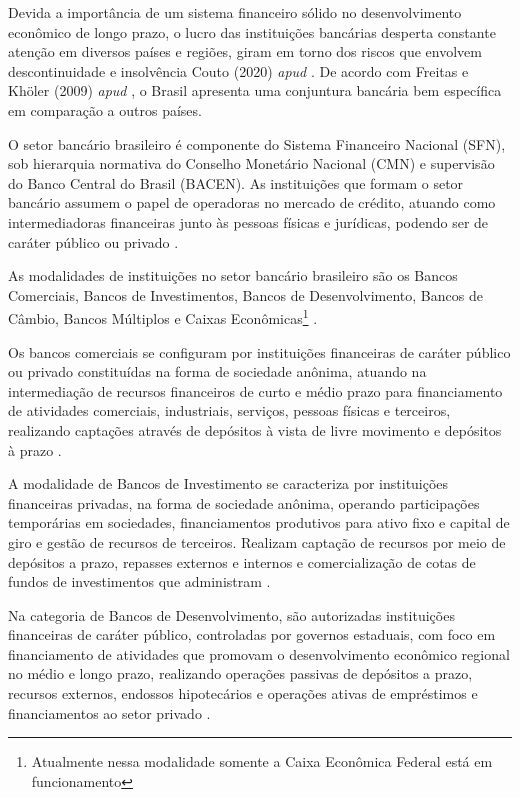 \documentclass[12pt,openright,oneside,a4paper,chapter=TITLE,section=TITLE,subsection=Title,english,french,spanish,portugues,sumario=tradicional]{04-class-files/abntex2}
\begin{document}
Devida a importância de um sistema financeiro sólido no desenvolvimento
econômico de longo prazo, o lucro das instituições bancárias desperta constante
atenção em diversos países e regiões, giram em torno dos riscos que envolvem
descontinuidade e insolvência Couto (2020) \emph{apud} \cite{dantas:2012}. De acordo
com Freitas e Khöler (2009) \emph{apud} \textcite{dantas:2012}, o Brasil apresenta
uma conjuntura bancária bem específica em comparação a outros países.

O setor bancário brasileiro é componente do Sistema Financeiro Nacional (SFN),
sob hierarquia normativa do Conselho Monetário Nacional (CMN) e supervisão do
Banco Central do Brasil (BACEN). As instituições que formam o setor bancário
assumem o papel de operadoras no mercado de crédito, atuando como
intermediadoras financeiras junto às pessoas físicas e jurídicas, podendo ser
de caráter público ou privado \cite{Lei:4595:1964}.

As modalidades de instituições no setor bancário brasileiro são os Bancos
Comerciais, Bancos de Investimentos, Bancos de Desenvolvimento, Bancos de
Câmbio, Bancos Múltiplos e Caixas Econômicas\footnote{Atualmente nessa
modalidade somente a Caixa Econômica Federal está em funcionamento} \cite{Lei:4595:1964}.

Os bancos comerciais se configuram por instituições financeiras de caráter
público ou privado constituídas na forma de sociedade anônima, atuando na
intermediação de recursos financeiros de curto e médio prazo para financiamento
de atividades comerciais, industriais, serviços, pessoas físicas e terceiros,
realizando captações através de depósitos à vista de livre movimento e
depósitos à prazo \cite{Res:2099:1994}.

A modalidade de Bancos de Investimento se caracteriza por instituições
financeiras privadas, na forma de sociedade anônima, operando participações
temporárias em sociedades, financiamentos produtivos para ativo fixo e capital
de giro e gestão de recursos de terceiros. Realizam captação de recursos por
meio de depósitos a prazo, repasses externos e internos e comercialização de
cotas de fundos de investimentos que administram \cite{Res:2624:1999}.

Na categoria de Bancos de Desenvolvimento, são autorizadas instituições financeiras de caráter público, controladas por governos estaduais, com foco em financiamento de atividades que promovam o desenvolvimento econômico regional no médio e longo prazo, realizando operações passivas de depósitos a prazo, recursos externos, endossos hipotecários e operações ativas de empréstimos e financiamentos ao setor privado \cite{Res:394:1976}.
\end{document}

